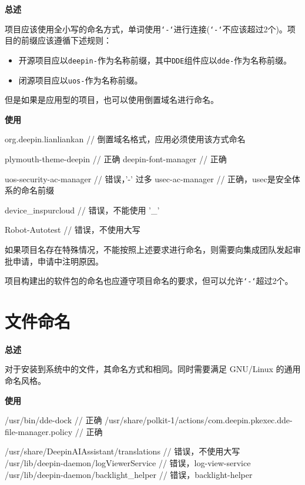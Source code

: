 \textbf{总述}

\deepin 项目应该使用全小写的命名方式，单词使用\texttt{`-`}进行连接(\texttt{`-`}不应该超过2个)。项目的前缀应该遵循下述规则：

\begin{itemize}
  \item 开源项目应以\texttt{deepin-}作为名称前缀，其中\texttt{DDE}组件应以\texttt{dde-}作为名称前缀。
  \item 闭源项目应以\texttt{uos-}作为名称前缀。
\end{itemize}

但是如果是应用型的项目，也可以使用倒置域名进行命名。

\textbf{使用}

\begin{cppcode}
  org.deepin.lianliankan	// 倒置域名格式，应用必须使用该方式命名

  plymouth-theme-deepin	// 正确
  deepin-font-manager	// 正确

  uos-security-ac-manager	// 错误，'-' 过多
  usec-ac-manager		// 正确，usec是安全体系的命名前缀

  device_inspurcloud	// 错误，不能使用 '_'

  Robot-Autotest	// 错误，不使用大写
\end{cppcode}

如果项目名存在特殊情况，不能按照上述要求进行命名，则需要向集成团队发起审批申请，申请中注明原因。

项目构建出的软件包的命名也应遵守项目命名的要求，但可以允许\texttt{`-`}超过2个。

\section{文件命名} \label{deepin-file-naming}

\textbf{总述}

对于安装到系统中的文件，其命名方式和相同。同时需要满足 GNU/Linux 的通用命名风格。

\textbf{使用}

\begin{cppcode}
  /usr/bin/dde-dock  // 正确
  /usr/share/polkit-1/actions/com.deepin.pkexec.dde-file-manager.policy  // 正确

  /usr/share/DeepinAIAssistant/translations  // 错误，不使用大写
  /usr/lib/deepin-daemon/logViewerService    // 错误，log-view-service
  /usr/lib/deepin-daemon/backlight_helper    // 错误，backlight-helper
\end{cppcode}

